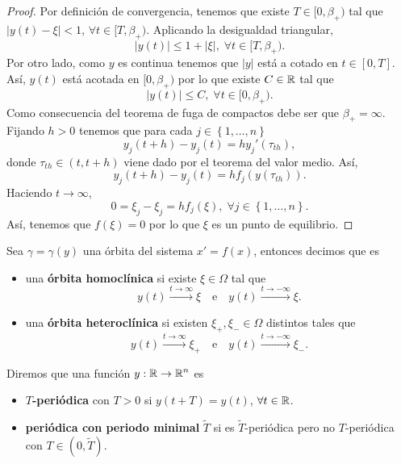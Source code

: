 \begin{proof}
Por definición de convergencia, tenemos que existe $\displaystyle T \in [0, \beta_{+}) $ tal que $\displaystyle \left|y\left(t\right)-\xi\right|<1 $, $\displaystyle \forall t \in [T, \beta_{+}) $. Aplicando la desigualdad triangular, 
\[ \left|y\left(t\right)\right|\leq 1 + \left|\xi\right|, \; \forall t \in [T, \beta_{+}) .\]
Por otro lado, como $\displaystyle y $ es continua tenemos que $\displaystyle \left|y\right| $ está a cotado en $\displaystyle t \in \left[0, T\right]  $. Así, $\displaystyle y\left(t\right) $ está acotada en $\displaystyle [0, \beta_{+}) $ por lo que existe $\displaystyle C \in \mathbb{R} $ tal que 
\[ \left|y\left(t\right)\right|\leq C, \; \forall t \in [0, \beta_{+}) .\]
Como consecuencia del teorema de fuga de compactos debe ser que $\displaystyle \beta_{+ }= \infty $. Fijando $\displaystyle h > 0 $ tenemos que para cada $\displaystyle j \in \left\{ 1, \ldots, n\right\}  $ 
\[y_{j}\left(t + h\right)-y_{j}\left(t\right) = hy_{j}'\left(\tau_{th}\right),\]
donde $\displaystyle \tau_{th}\in \left(t, t+ h\right) $ viene dado por el teorema del valor medio. Así, 
\[y_{j}\left(t + h\right)-y_{j}\left(t\right)=hf_{j}\left(y\left(\tau_{th}\right)\right).\]
Haciendo $\displaystyle t \to \infty $, 
\[0 = \xi_{j}-\xi_{j} = hf_{j}\left(\xi\right), \; \forall j \in \left\{ 1, \ldots, n\right\}  .\]
Así, tenemos que $\displaystyle f\left(\xi\right)=0 $ por lo que $\displaystyle \xi $ es un punto de equilibrio.
\end{proof}
\begin{definition}
Sea $\displaystyle \gamma = \gamma\left(y\right) $ una órbita del sistema $\displaystyle x' = f\left(x\right) $, entonces decimos que es
\begin{itemize}
	\item una \textbf{órbita homoclínica} si existe $\displaystyle \xi \in \Omega  $ tal que  
		\[ y\left(t\right)\xrightarrow{t \to \infty } \xi\quad \text{e} \quad y\left(t\right)\xrightarrow{t \to -\infty } \xi .\]
	\item una \textbf{órbita heteroclínica} si existen $\displaystyle \xi_{+ }, \xi_{- }\in \Omega  $ distintos tales que  
		\[ y\left(t\right)\xrightarrow{t \to \infty}\xi_{+ }\quad \text{e}\quad y\left(t\right)\xrightarrow{t \to - \infty}\xi_{- }.\]	
\end{itemize}
\end{definition}
\begin{definition}
Diremos que una función $\displaystyle y : \mathbb{R} \to \mathbb{R}^{n} $ es 
\begin{itemize}
\item \textbf{$\displaystyle T $-periódica} con $\displaystyle T > 0 $ si $\displaystyle y\left(t + T\right)= y\left(t\right) $, $\displaystyle \forall t \in \mathbb{R} $.
\item \textbf{periódica con periodo minimal} $\displaystyle \tilde{T} $ si es $\displaystyle \tilde{T} $-periódica pero no $\displaystyle T $-periódica con $\displaystyle T \in \left(0, \tilde{T}\right) $. 
\end{itemize}
\end{definition}
